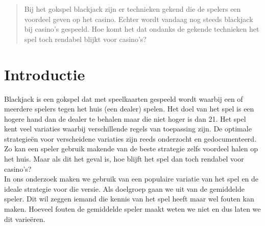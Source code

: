 \documentclass[conference]{IEEEtran}
\begin{document}
\begin{abstract}
Bij het gokspel blackjack zijn er technieken gekend die de spelers een voordeel geven op het casino. Echter wordt vandaag nog steeds blackjack bij casino's gespeeld. Hoe komt het dat ondanks de gekende technieken het spel toch rendabel blijkt voor casino's?
\end{abstract}





%
\IEEEpeerreviewmaketitle



\section{Introductie}
Blackjack is een gokspel dat met speelkaarten gespeeld wordt waarbij een of meerdere spelers tegen het huis (een dealer) spelen. Het doel van het spel is een hogere hand dan de dealer te behalen maar die niet hoger is dan 21. Het spel kent veel variaties waarbij verschillende regels van toepassing zijn. De optimale strategie\"en voor verscheidene variaties zijn reeds onderzocht en gedocumenteerd. Zo kan een speler gebruik makende van de beste strategie zelfs voordeel halen op het huis. Maar als dit het geval is, hoe blijft het spel dan toch rendabel voor casino's?
\\In ons onderzoek maken we gebruik van een populaire variatie van het spel en de ideale strategie voor die versie. Als doelgroep gaan we uit van de gemiddelde speler. Dit wil zeggen iemand die kennis van het spel heeft maar wel fouten kan maken. Hoeveel fouten de gemiddelde speler maakt weten we niet en dus laten we dit varie\"eren.
\end{document}
